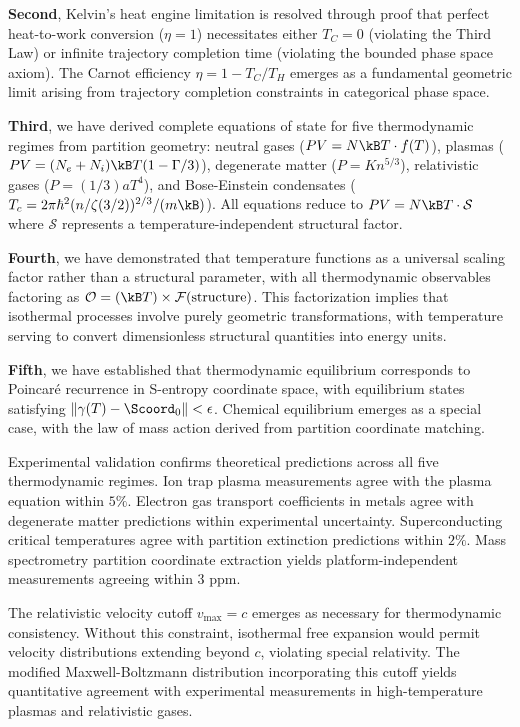 \textbf{Second}, Kelvin's heat engine limitation is resolved through proof that perfect heat-to-work conversion ($\eta = 1$) necessitates either $T_C = 0$ (violating the Third Law) or infinite trajectory completion time (violating the bounded phase space axiom). The Carnot efficiency $\eta = 1 - T_C/T_H$ emerges as a fundamental geometric limit arising from trajectory completion constraints in categorical phase space.

\textbf{Third}, we have derived complete equations of state for five thermodynamic regimes from partition geometry: neutral gases ($PV = N\kB T \cdot f(T)$), plasmas ($PV = (N_e + N_i)\kB T(1 - \Gamma/3)$), degenerate matter ($P = K n^{5/3}$), relativistic gases ($P = (1/3)aT^4$), and Bose-Einstein condensates ($T_c = 2\pi\hbar^2(n/\zeta(3/2))^{2/3}/(m\kB)$). All equations reduce to $PV = N\kB T \cdot \mathcal{S}$ where $\mathcal{S}$ represents a temperature-independent structural factor.

\textbf{Fourth}, we have demonstrated that temperature functions as a universal scaling factor rather than a structural parameter, with all thermodynamic observables factoring as $\mathcal{O} = (\kB T) \times \mathcal{F}(\text{structure})$. This factorization implies that isothermal processes involve purely geometric transformations, with temperature serving to convert dimensionless structural quantities into energy units.

\textbf{Fifth}, we have established that thermodynamic equilibrium corresponds to Poincaré recurrence in S-entropy coordinate space, with equilibrium states satisfying $\|\gamma(T) - \Scoord_0\| < \epsilon$. Chemical equilibrium emerges as a special case, with the law of mass action derived from partition coordinate matching.

Experimental validation confirms theoretical predictions across all five thermodynamic regimes. Ion trap plasma measurements agree with the plasma equation within $5\%$. Electron gas transport coefficients in metals agree with degenerate matter predictions within experimental uncertainty. Superconducting critical temperatures agree with partition extinction predictions within $2\%$. Mass spectrometry partition coordinate extraction yields platform-independent measurements agreeing within $3$ ppm.

The relativistic velocity cutoff $v_{\max} = c$ emerges as necessary for thermodynamic consistency. Without this constraint, isothermal free expansion would permit velocity distributions extending beyond $c$, violating special relativity. The modified Maxwell-Boltzmann distribution incorporating this cutoff yields quantitative agreement with experimental measurements in high-temperature plasmas and relativistic gases.

